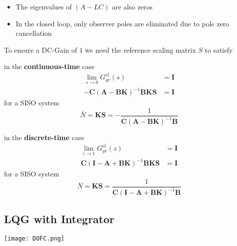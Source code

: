 \begin{itemize}
    \item The eigenvalues of $(A-LC)$ are also zeros
    \item In the closed loop, only observer poles are eliminated due to pole zero cancellation
\end{itemize}




To ensure a DC-Gain of $1$ we need the reference scaling matrix $S$ to satisfy

in the \textbf{continuous-time} case
\begin{align*}
    \lim_{s\to0}G_{yr}^{cl}(s)                             & = \mathbf{I} \\
    -\mathbf{C}{(\mathbf{A}-\mathbf{BK})}^{-1}\mathbf{BKS} & = \mathbf{I}
\end{align*}
for a SISO system
\begin{equation*}
    \bar{N}=\mathbf{KS}=-\frac{1}{\mathbf{C}{(\mathbf{A}-\mathbf{BK})}^{-1}\mathbf{B}}
\end{equation*}

in the \textbf{discrete-time} case
\begin{align*}
    \lim_{z\to1}G_{yr}^{cl}(z)                                       & = \mathbf{I} \\
    \mathbf{C}{(\mathbf{I}-\mathbf{A}+\mathbf{BK})}^{-1}\mathbf{BKS} & = \mathbf{I}
\end{align*}
for a SISO system
\begin{equation*}
    \bar{N}=\mathbf{KS}=\frac{1}{\mathbf{C}{(\mathbf{I}-\mathbf{A}+\mathbf{BK})}^{-1}\mathbf{B}}
\end{equation*}

\subsection{LQG with Integrator}

\begin{center}
    \texttt{[image: DOFC.png]}
\end{center}

